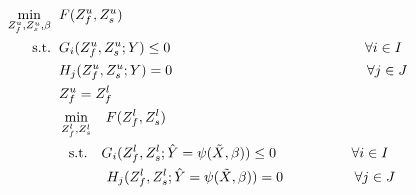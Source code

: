 \documentclass[12pt]{article}
\begin{document}
\begin{subequations}
\begin{flalign}
\min\limits_{{Z_f^u,Z_s^u,\beta}} \hspace{2 mm} & F(Z_f^u,Z_s^u) \label{eq:eq1-1}\\
\textrm{s.t.} \hspace{2 mm} & G_i(Z_f^u,Z_s^u;Y)\leq 0 \hspace{49 mm} \forall i \in I\\
& H_j(Z_f^u,Z_s^u;Y)=0 \hspace{49 mm} \forall j \in J\\
& Z_f^u=Z_f^l \label{eq:eq1-3}\\
&\min\limits_{Z_f^l,Z_s^l}  \hspace{3 mm} F(Z_f^l,Z_s^l)\\
&\hspace{2.5 mm} \textrm{s.t.} \hspace{3.5 mm} G_i(Z_f^l,Z_s^l;\hat{Y}=\psi(\Tilde{X},\beta))\leq 0 \hspace{19 mm} \forall i \in I\\
&\hspace{12 mm} H_j(Z_f^l,Z_s^l;\hat{Y}=\psi(\Tilde{X},\beta))= 0 \hspace{18 mm} \forall j \in J \label{eq:eq1-2}
\end{flalign}
\end{subequations}
\end{document}
